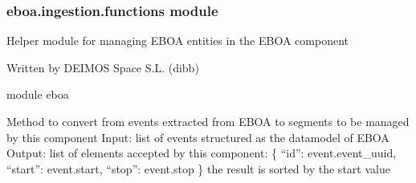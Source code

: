 \begin{fulllineitems}
\label{\detokenize{eboa.ingestion:eboa.ingestion.eboa_ingestion.main}}
\end{fulllineitems}



\subsubsection{eboa.ingestion.functions module}
\label{\detokenize{eboa.ingestion:module-eboa.ingestion.functions}}\label{\detokenize{eboa.ingestion:eboa-ingestion-functions-module}}
Helper module for managing EBOA entities in the EBOA component

Written by DEIMOS Space S.L. (dibb)

module eboa

\begin{fulllineitems}
\label{\detokenize{eboa.ingestion:eboa.ingestion.functions.convert_eboa_events_to_date_segments}}
Method to convert from events extracted from EBOA to segments to be managed by this component
Input: list of events structured as the datamodel of EBOA
Output: list of elements accepted by this component:
\{
“id”: event.event\_uuid,
“start”: event.start,
“stop”: event.stop
\}
the result is sorted by the start value

\end{fulllineitems}


